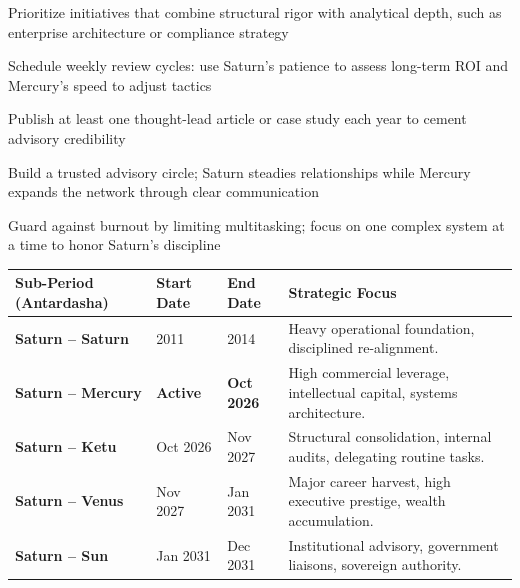 \begin{diamondlist}
  \item {\fontsize{8.5}{12}\selectfont Prioritize initiatives that combine structural rigor with analytical depth, such as enterprise architecture or compliance strategy}
  \item {\fontsize{8.5}{12}\selectfont Schedule weekly review cycles: use Saturn's patience to assess long-term ROI and Mercury's speed to adjust tactics}
  \item {\fontsize{8.5}{12}\selectfont Publish at least one thought-lead article or case study each year to cement advisory credibility}
  \item {\fontsize{8.5}{12}\selectfont Build a trusted advisory circle; Saturn steadies relationships while Mercury expands the network through clear communication}
  \item {\fontsize{8.5}{12}\selectfont Guard against burnout by limiting multitasking; focus on one complex system at a time to honor Saturn's discipline}
\end{diamondlist}


\begin{executivecard}
  \sffamily\fontsize{8}{11.5}\selectfont
  \begin{tabularx}{\linewidth}{@{}l l l X@{}}
    \toprule
    \textbf{Sub-Period (Antardasha)} & \textbf{Start Date} & \textbf{End Date} & \textbf{Strategic Focus} \\
    \midrule
    \textbf{Saturn -- Saturn} & 2011 & 2014 & Heavy operational foundation, disciplined re-alignment. \\
    \textbf{Saturn -- Mercury} & \textbf{Active} & \textbf{Oct 2026} & High commercial leverage, intellectual capital, systems architecture. \\
    \textbf{Saturn -- Ketu} & Oct 2026 & Nov 2027 & Structural consolidation, internal audits, delegating routine tasks. \\
    \textbf{Saturn -- Venus} & Nov 2027 & Jan 2031 & Major career harvest, high executive prestige, wealth accumulation. \\
    \textbf{Saturn -- Sun} & Jan 2031 & Dec 2031 & Institutional advisory, government liaisons, sovereign authority. \\
    \bottomrule
  \end{tabularx}
\end{executivecard}\vspace{2mm}

